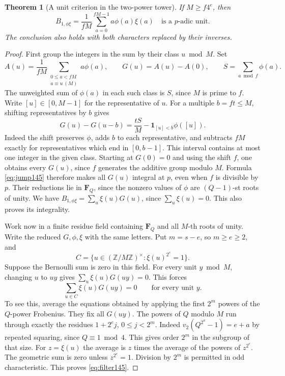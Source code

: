 \documentclass[a4paper,11pt]{article}
\newtheorem{theorem}[proposition]{Theorem}
\theoremstyle{definition}
\theoremstyle{remark}
\newcommand{\ZZ}{\mathbb Z}\newcommand{\ord}{\operatorname{ord}}
\numberwithin{equation}{section}
\begin{document}
\begin{theorem}[A unit criterion in the two-power tower]
\label{thm:fourier145}
If \(M\ge f4^e\), then
\[
     B_{1,\phi\xi}
       =\frac1{fM}\sum_{a=0}^{fM-1}a\phi(a)\xi(a)
       \quad\text{is a \(p\)-adic unit.}
\]
The conclusion also holds with both characters replaced by
their inverses.
\end{theorem}
\begin{proof}
First group the integers in the sum by their class \(u\bmod M\).
Set
\[
  A(u)=\frac1{fM}\!\!\sum_{\substack{0\le a<fM\\a\equiv u\ (M)}}
                      a\phi(a),\qquad
  G(u)=A(u)-A(0),\qquad S=\sum_{a\bmod f}\phi(a).
\]
The unweighted sum of \(\phi(a)\) in each such class is \(S\),
since \(M\) is prime to \(f\). Write \([u]\in[0,M-1]\) for
the representative of \(u\). For a multiple \(b=ft\le M\),
shifting representatives by \(b\) gives
\begin{equation}
    G(u)-G(u-b)=\frac{tS}{M}
                   -\mathbf1_{[u]<b}\phi([u]).
    \label{eq:jump145}
\end{equation}
Indeed the shift preserves \(\phi\), adds \(b\) to each
representative, and subtracts \(fM\) exactly for representatives
which end in \([0,b-1]\). This interval contains at most one
integer in the given class. Starting at \(G(0)=0\) and using
the shift \(f\), one obtains every \(G(u)\), since \(f\) generates
the additive group modulo \(M\). Formula \eqref{eq:jump145}
therefore makes all \(G(u)\) integral at \(p\), even when
\(f\) is divisible by \(p\). Their reductions lie in
\(\mathbf F_Q\), since the nonzero values of \(\phi\) are
\((Q-1)\)-st roots of unity. We have
\(B_{1,\phi\xi}=\sum_u \xi(u)G(u)\), since
\(\sum_u\xi(u)=0\). This also proves its integrality.

Work now in a finite residue field containing \(\mathbf F_Q\)
and all \(M\)-th roots of unity. Write the reduced \(G,\phi,\xi\)
with the same letters. Put \(m=s-e\), so \(m\ge e\ge2\), and
\[
       C=\{u\in(\ZZ/M\ZZ)^\times:\xi(u)^{2^e}=1\}.
\]
Suppose the Bernoulli sum is zero in this field. For every unit
\(y\bmod M\), changing \(u\) to \(uy\) gives
\(\sum_u\xi(u)G(uy)=0\). This forces
\begin{equation}
               \sum_{u\in C}\xi(u)G(uy)=0
               \qquad \text{for every unit }y .
               \label{eq:filter145}
\end{equation}
To see this, average the equations obtained by applying the
first \(2^m\) powers of the \(Q\)-power Frobenius. They fix
all \(G(uy)\). The powers of \(Q\) modulo \(M\) run through
exactly the residues \(1+2^e j\), \(0\le j<2^m\). Indeed
\(v_2(Q^{2^a}-1)=e+a\) by repeated squaring, since \(Q\equiv1\bmod4\).
This gives order \(2^m\) in the subgroup of that size.
For \(z=\xi(u)\) the average is \(z\) times the average of the
powers of \(z^{2^e}\). The geometric sum is zero unless
\(z^{2^e}=1\). Division by \(2^m\) is permitted in odd
characteristic. This proves \eqref{eq:filter145}.


\end{proof}
\end{document}
